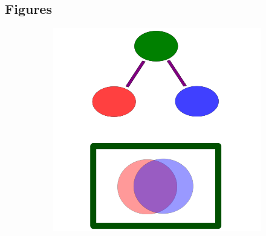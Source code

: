 \documentclass{bmcart}
\begin{document}
\begin{backmatter}

\section*{Figures}


\begin{figure}[h!]
  \begin{subfigure}[b]{0.3\textwidth}
    \includegraphics[width=\textwidth]{figures/RedundancyTrimmingOntogeny.png}
   	 	\caption{}
    \label{fig:simdiagram}
  \end{subfigure}
  \begin{subfigure}[b]{0.3\textwidth}

\end{subfigure}
\end{figure}
\end{backmatter}
\end{document}
